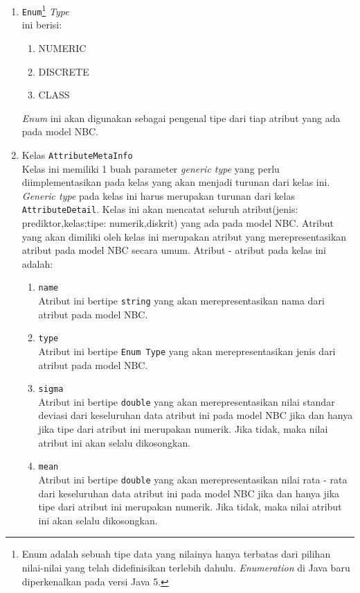 \begin{enumerate}
	\item \texttt{Enum}\footnote{Enum adalah sebuah tipe data yang nilainya hanya terbatas dari pilihan nilai-nilai yang telah didefinisikan terlebih dahulu. \textit{Enumeration} di Java baru diperkenalkan pada versi Java 5.} \textit{Type}\\ ini berisi:
	\begin{enumerate}
		\item NUMERIC
		\item DISCRETE
		\item CLASS
	\end{enumerate}
	\textit{Enum} ini akan digunakan sebagai pengenal tipe dari tiap atribut yang ada pada model NBC.
	
	\item{Kelas \texttt{AttributeMetaInfo}}\\
	Kelas ini memiliki 1 buah parameter \textit{generic type} yang perlu diimplementasikan pada kelas yang akan menjadi turunan dari kelas ini. \textit{Generic type} pada kelas ini harus merupakan turunan dari kelas \texttt{AttributeDetail}. Kelas ini akan mencatat seluruh atribut(jenis: prediktor,kelas;tipe: numerik,diskrit) yang ada pada model NBC. Atribut yang akan dimiliki oleh kelas ini merupakan atribut yang merepresentasikan atribut pada model NBC secara umum. Atribut - atribut pada kelas ini adalah:
	\begin{enumerate}
		\item{\texttt{name}}\\ 
		Atribut ini bertipe \texttt{string} yang akan merepresentasikan nama dari atribut pada model NBC.

		\item{\texttt{type}}\\
		Atribut ini bertipe \texttt{Enum Type} yang akan merepresentasikan jenis dari atribut pada model NBC.

		\item{\texttt{sigma}}\\
		Atribut ini bertipe \texttt{double} yang akan merepresentasikan nilai standar deviasi dari keseluruhan data atribut ini pada model NBC jika dan hanya jika tipe dari atribut ini merupakan numerik. Jika tidak, maka nilai atribut ini akan selalu dikosongkan.

		\item{\texttt{mean}}\\
		Atribut ini bertipe \texttt{double} yang akan merepresentasikan nilai rata - rata dari keseluruhan data atribut ini pada model NBC jika dan hanya jika tipe dari atribut ini merupakan numerik. Jika tidak, maka nilai atribut ini akan selalu dikosongkan.


\end{enumerate}
\end{enumerate}
